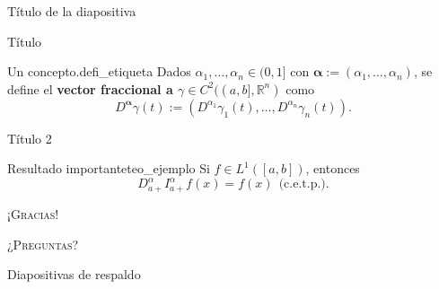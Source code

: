\documentclass{UADYbeamer}
\begin{document}
\begin{frame}{Título de la diapositiva}
    \begin{cublock}
        \begin{overlayarea}{\textwidth}{\baselineskip}
        \end{overlayarea}
    \end{cublock}
\end{frame}

\begin{frame}{Título}
    \begin{defi}{Un concepto.}{defi_etiqueta}
        Dados $\alpha_1,\ldots,\alpha_n\in (0,1]$ con $\mathbf{\alpha}:=(\alpha_1,\ldots,\alpha_n)$, se define el \textbf{vector fraccional a $\gamma\in C^2((a,b],\mathbb{R}^n)$} como
        $$D^{\mathbf{\alpha}}\gamma(t):=(D^{\alpha_1}\gamma_1(t),\ldots,D^{\alpha_n}\gamma_n(t)).$$
    \end{defi}
\end{frame}

\begin{frame}{Título 2}
    \begin{teo}{Resultado importante}{teo_ejemplo}
        Si $f\in L^1([a,b])$, entonces 
$$D^{\alpha}_{a+}I^{\alpha}_{a+}f(x)=f(x)~~\text{(c.e.t.p.)}.$$
    \end{teo}
\end{frame}
\begin{frame}[standout]
    \Huge\textsc{¡Gracias!}
    
    \vfill
    
    \LARGE\textsc{¿Preguntas?}
\end{frame}

\appendix

\begin{frame}{Diapositivas de respaldo}
    
\end{frame}
\end{document}
